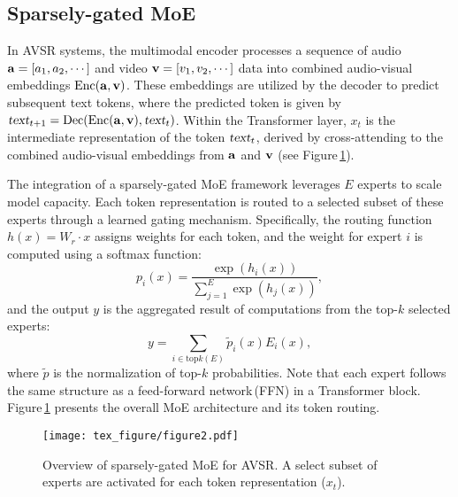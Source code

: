 \subsection{Sparsely-gated MoE}
\label{subsec:sparse_moe}

In AVSR systems, the multimodal encoder processes a sequence of audio ${\mathbf{a}} = [a_1, a_2, \cdots]$ and video ${\mathbf{v}} = [v_1, v_2, \cdots]$ data into combined audio-visual embeddings $\text{Enc}({\mathbf{a}}, {\mathbf{v}})$. These embeddings are utilized by the decoder to predict subsequent text tokens, where the predicted token is given by $\textsl{text}_{t+1} = \text{Dec}(\text{Enc}({\mathbf{a}}, {\mathbf{v}}), \textsl{text}_t)$. Within the Transformer layer, $x_t$ is the intermediate representation of the token $\textsl{text}_t$, derived by cross-attending to the combined audio-visual embeddings from ${\mathbf{a}}$ and ${\mathbf{v}}$ (see Figure\,\ref{fig:overview}).

The integration of a sparsely-gated MoE framework \citep{shazeer2017outrageously, lepikhin2021gshard} leverages $E$ experts to scale model capacity. Each token representation is routed to a selected subset of these experts through a learned gating mechanism. 
Specifically, the routing function $h(x) = W_r \cdot x$ assigns weights for each token, and the weight for expert $i$ is computed using a softmax function:
\begin{equation}
\label{eq:router_weight}
    p_i(x) = \frac{\exp(h_i(x))}{\sum_{j=1}^{E} \exp(h_j(x))},
\end{equation}
and the output $y$ is the aggregated result of computations from the top-$k$ selected experts:
\begin{equation}
y = \sum_{i \in \text{top}k(E)} \tilde{p}_i(x) E_i(x),
\end{equation}
where $\tilde{p}$ is the normalization of top-$k$ probabilities.
Note that each expert follows the same structure as a feed-forward network\,(FFN) in a Transformer block. Figure\,\ref{fig:overview} presents the overall MoE architecture and its token routing.



\begin{figure}[!t]
    \centering
    \vspace*{-5pt}
    \texttt{[image: tex\_figure/figure2.pdf]}
    \vspace*{-20pt}
    \caption{Overview of sparsely-gated MoE for AVSR. A select subset of experts are activated for each token representation ($x_t$).
    }
    \label{fig:overview}
    \vspace{-5pt}
\end{figure}


